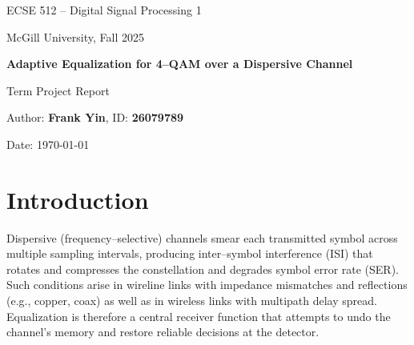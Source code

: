 \documentclass[12pt]{article}
\begin{document}
\begin{titlepage}
  \centering
  {\Large ECSE 512 -- Digital Signal Processing 1\par}
  \vspace{1em}
  {\Large McGill University, Fall 2025\par}
  \vspace{2em}
  {\huge\bfseries Adaptive Equalization for 4--QAM over a Dispersive Channel\par}
  \vspace{2em}
  {\large Term Project Report\par}
  \vspace{1em}
  {\large Author: \textbf{Frank Yin}, ID: \textbf{26079789}\par}
  \vspace{1em}
  {\large Date: \today\par}
  \vfill
  \begin{abstract}
  This project implements and evaluates a LMS--based decision--directed adaptive FIR equalizer for 4--QAM transmission over frequency--selective channels that induce inter--symbol interference (ISI). The complete MATLAB simulation chain includes a channel model with unit energy, complex AWGN, a training sequence followed by a decision--directed phase, and performance assessment via learning curves and symbol error rate (SER). It studies the impact of SNR, equalizer length, and step size. Results confirm that the LMS equalizer effectively mitigates ISI and tracks slow variations when properly tuned.
  \end{abstract}
  \vfill
\end{titlepage}
\setcounter{page}{1}

\tableofcontents
\newpage


\section{Introduction}
Dispersive (frequency--selective) channels smear each transmitted symbol across multiple sampling intervals, producing inter--symbol interference (ISI) that rotates and compresses the constellation and degrades symbol error rate (SER). Such conditions arise in wireline links with impedance mismatches and reflections (e.g., copper, coax) as well as in wireless links with multipath delay spread. Equalization is therefore a central receiver function that attempts to undo the channel's memory and restore reliable decisions at the detector.
\end{document}
